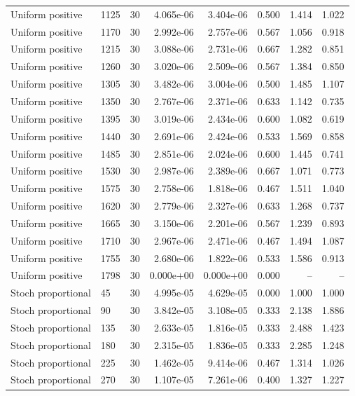 \begin{scriptsize}
\begin{longtable}{llrrrrrr}
Uniform positive & 1125 & 30 & 4.065e-06 & 3.404e-06 & 0.500 & 1.414 & 1.022 \\
Uniform positive & 1170 & 30 & 2.992e-06 & 2.757e-06 & 0.567 & 1.056 & 0.918 \\
Uniform positive & 1215 & 30 & 3.088e-06 & 2.731e-06 & 0.667 & 1.282 & 0.851 \\
Uniform positive & 1260 & 30 & 3.020e-06 & 2.509e-06 & 0.567 & 1.384 & 0.850 \\
Uniform positive & 1305 & 30 & 3.482e-06 & 3.004e-06 & 0.500 & 1.485 & 1.107 \\
Uniform positive & 1350 & 30 & 2.767e-06 & 2.371e-06 & 0.633 & 1.142 & 0.735 \\
Uniform positive & 1395 & 30 & 3.019e-06 & 2.434e-06 & 0.600 & 1.082 & 0.619 \\
Uniform positive & 1440 & 30 & 2.691e-06 & 2.424e-06 & 0.533 & 1.569 & 0.858 \\
Uniform positive & 1485 & 30 & 2.851e-06 & 2.024e-06 & 0.600 & 1.445 & 0.741 \\
Uniform positive & 1530 & 30 & 2.987e-06 & 2.389e-06 & 0.667 & 1.071 & 0.773 \\
Uniform positive & 1575 & 30 & 2.758e-06 & 1.818e-06 & 0.467 & 1.511 & 1.040 \\
Uniform positive & 1620 & 30 & 2.779e-06 & 2.327e-06 & 0.633 & 1.268 & 0.737 \\
Uniform positive & 1665 & 30 & 3.150e-06 & 2.201e-06 & 0.567 & 1.239 & 0.893 \\
Uniform positive & 1710 & 30 & 2.967e-06 & 2.471e-06 & 0.467 & 1.494 & 1.087 \\
Uniform positive & 1755 & 30 & 2.680e-06 & 1.822e-06 & 0.533 & 1.586 & 0.913 \\
Uniform positive & 1798 & 30 & 0.000e+00 & 0.000e+00 & 0.000 & -- & -- \\
Stoch proportional & 45 & 30 & 4.995e-05 & 4.629e-05 & 0.000 & 1.000 & 1.000 \\
Stoch proportional & 90 & 30 & 3.842e-05 & 3.108e-05 & 0.333 & 2.138 & 1.886 \\
Stoch proportional & 135 & 30 & 2.633e-05 & 1.816e-05 & 0.333 & 2.488 & 1.423 \\
Stoch proportional & 180 & 30 & 2.315e-05 & 1.836e-05 & 0.333 & 2.285 & 1.248 \\
Stoch proportional & 225 & 30 & 1.462e-05 & 9.414e-06 & 0.467 & 1.314 & 1.026 \\
Stoch proportional & 270 & 30 & 1.107e-05 & 7.261e-06 & 0.400 & 1.327 & 1.227 \\

\end{longtable}
\end{scriptsize}
